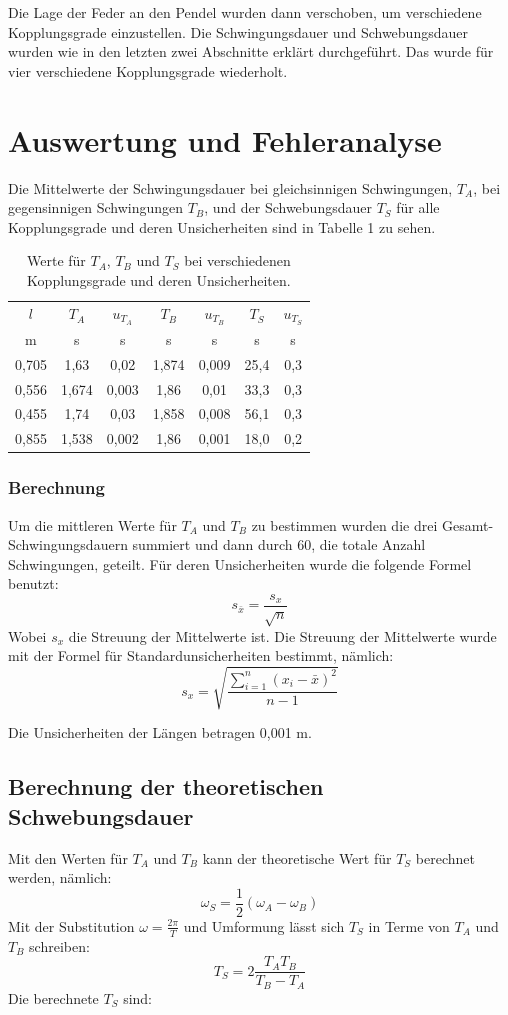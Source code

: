 \documentclass[11pt,a4paper]{article}
\begin{document}
Die Lage der Feder an den Pendel wurden dann verschoben, um verschiedene Kopplungsgrade einzustellen. Die Schwingungsdauer und Schwebungsdauer wurden wie in den letzten zwei Abschnitte erklärt durchgeführt. Das wurde für vier verschiedene Kopplungsgrade wiederholt. 

\section{Auswertung und Fehleranalyse}
Die Mittelwerte der Schwingungsdauer bei gleichsinnigen Schwingungen, $T_A$, bei gegensinnigen Schwingungen $T_B$, und der Schwebungsdauer $T_S$ für alle Kopplungsgrade und deren Unsicherheiten sind in Tabelle 1 zu sehen. 
\begin{table} [h]
	\begin{tabular*}{0.99\textwidth}{@{\extracolsep{\fill}}c|cccccc}
		\toprule
		$l$ & $T_A$ & $u_{T_A}$ & $T_B$ & $u_{T_B}$ & $T_S$ & $u_{T_S}$  \\
		m & s & s & s & s & s & s   \\
		\bottomrule
		0,705 & 1,63 & 0,02 & 1,874 & 0,009 & 25,4 & 0,3 \\
		0,556 & 1,674 & 0,003 & 1,86 & 0,01 & 33,3 & 0,3 \\
		0,455 & 1,74 & 0,03 & 1,858 & 0,008 & 56,1 & 0,3\\
		0,855 & 1,538 & 0,002 & 1,86 & 0,001 & 18,0 & 0,2 \\
		\bottomrule
	\end{tabular*}
	\caption{Werte für $T_A$, $T_B$ und $T_S$ bei verschiedenen Kopplungsgrade und deren Unsicherheiten.}
\end{table}
\subsubsection{Berechnung}
Um die mittleren Werte für $T_A$ und $T_B$ zu bestimmen wurden die drei Gesamt-Schwingungsdauern summiert und dann durch 60, die totale Anzahl Schwingungen, geteilt. Für deren Unsicherheiten wurde die folgende Formel benutzt:
$$ s_{\bar{x}} = \frac{s_x}{\sqrt{n}}$$
Wobei $s_x$ die Streuung der Mittelwerte ist. Die Streuung der Mittelwerte wurde mit der Formel für Standardunsicherheiten bestimmt, nämlich:
$$s_x=\sqrt{\frac{\sum_{i=1}^{n}(x_i-\bar{x})^2}{n-1}}$$

Die Unsicherheiten der Längen betragen 0,001 m. 

\subsection{Berechnung der theoretischen Schwebungsdauer}
Mit den Werten für $T_A$ und $T_B$ kann der theoretische Wert für $T_S$ berechnet werden, nämlich:
$$\omega_S = \frac{1}{2}(\omega_A-\omega_B)$$
Mit der Substitution $\omega = \frac{2\pi}{T}$ und Umformung lässt sich $T_S$ in Terme von $T_A$ und $T_B$ schreiben:
\begin{equation}
T_S = 2\frac{T_A T_B}{T_B-T_A}
\end{equation}
Die berechnete $T_S$ sind:
\end{document}
